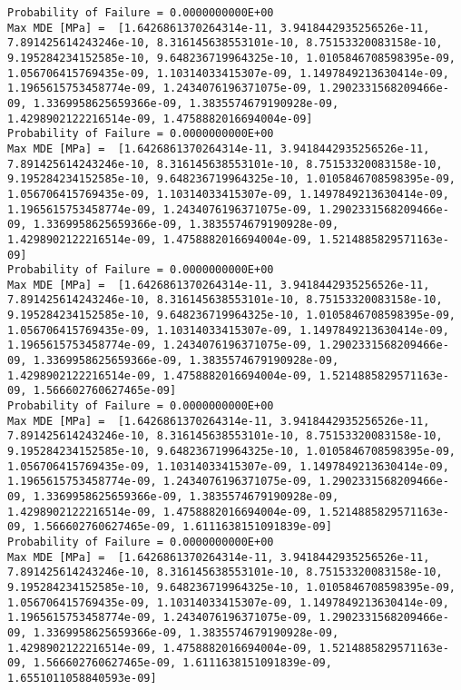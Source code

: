 \documentclass[11pt]{article}
\begin{document}
\begin{Verbatim}[commandchars=\\\{\}]
Probability of Failure = 0.0000000000E+00
Max MDE [MPa] =  [1.6426861370264314e-11, 3.9418442935256526e-11, 7.891425614243246e-10, 8.316145638553101e-10, 8.75153320083158e-10, 9.195284234152585e-10, 9.648236719964325e-10, 1.0105846708598395e-09, 1.056706415769435e-09, 1.10314033415307e-09, 1.1497849213630414e-09, 1.1965615753458774e-09, 1.2434076196371075e-09, 1.2902331568209466e-09, 1.3369958625659366e-09, 1.3835574679190928e-09, 1.4298902122216514e-09, 1.4758882016694004e-09]
Probability of Failure = 0.0000000000E+00
Max MDE [MPa] =  [1.6426861370264314e-11, 3.9418442935256526e-11, 7.891425614243246e-10, 8.316145638553101e-10, 8.75153320083158e-10, 9.195284234152585e-10, 9.648236719964325e-10, 1.0105846708598395e-09, 1.056706415769435e-09, 1.10314033415307e-09, 1.1497849213630414e-09, 1.1965615753458774e-09, 1.2434076196371075e-09, 1.2902331568209466e-09, 1.3369958625659366e-09, 1.3835574679190928e-09, 1.4298902122216514e-09, 1.4758882016694004e-09, 1.5214885829571163e-09]
Probability of Failure = 0.0000000000E+00
Max MDE [MPa] =  [1.6426861370264314e-11, 3.9418442935256526e-11, 7.891425614243246e-10, 8.316145638553101e-10, 8.75153320083158e-10, 9.195284234152585e-10, 9.648236719964325e-10, 1.0105846708598395e-09, 1.056706415769435e-09, 1.10314033415307e-09, 1.1497849213630414e-09, 1.1965615753458774e-09, 1.2434076196371075e-09, 1.2902331568209466e-09, 1.3369958625659366e-09, 1.3835574679190928e-09, 1.4298902122216514e-09, 1.4758882016694004e-09, 1.5214885829571163e-09, 1.566602760627465e-09]
Probability of Failure = 0.0000000000E+00
Max MDE [MPa] =  [1.6426861370264314e-11, 3.9418442935256526e-11, 7.891425614243246e-10, 8.316145638553101e-10, 8.75153320083158e-10, 9.195284234152585e-10, 9.648236719964325e-10, 1.0105846708598395e-09, 1.056706415769435e-09, 1.10314033415307e-09, 1.1497849213630414e-09, 1.1965615753458774e-09, 1.2434076196371075e-09, 1.2902331568209466e-09, 1.3369958625659366e-09, 1.3835574679190928e-09, 1.4298902122216514e-09, 1.4758882016694004e-09, 1.5214885829571163e-09, 1.566602760627465e-09, 1.6111638151091839e-09]
Probability of Failure = 0.0000000000E+00
Max MDE [MPa] =  [1.6426861370264314e-11, 3.9418442935256526e-11, 7.891425614243246e-10, 8.316145638553101e-10, 8.75153320083158e-10, 9.195284234152585e-10, 9.648236719964325e-10, 1.0105846708598395e-09, 1.056706415769435e-09, 1.10314033415307e-09, 1.1497849213630414e-09, 1.1965615753458774e-09, 1.2434076196371075e-09, 1.2902331568209466e-09, 1.3369958625659366e-09, 1.3835574679190928e-09, 1.4298902122216514e-09, 1.4758882016694004e-09, 1.5214885829571163e-09, 1.566602760627465e-09, 1.6111638151091839e-09, 1.6551011058840593e-09]

\end{Verbatim}
\end{document}
